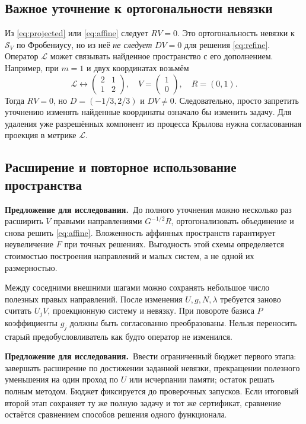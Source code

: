 \documentclass[11pt,a4paper]{article}
\numberwithin{equation}{section}
\theoremstyle{remark}
\newcommand{\proposal}{\par\noindent\textbf{Предложение для исследования.}\ }
\begin{document}
\subsection{Важное уточнение к ортогональности невязки}
Из \eqref{eq:projected} или \eqref{eq:affine} следует $RV=0$.
Это ортогональность невязки к $\mathcal S_V$ по Фробениусу, но из неё
\emph{не следует} $DV=0$ для решения \eqref{eq:refine}.
Оператор $\mathcal L$ может связывать найденное пространство с его
дополнением. Например, при $m=1$ и двух координатах возьмём
\[
 \mathcal L\leftrightarrow
 \begin{pmatrix}2&1\\1&2\end{pmatrix},
 \quad V=\begin{pmatrix}1\\0\end{pmatrix},
 \quad R=(0,1).
\]
Тогда $RV=0$, но $D=(-1/3,2/3)$ и $DV\ne0$.
Следовательно, просто запретить уточнению изменять найденные координаты
означало бы изменить задачу. Для удаления уже разрешённых компонент
из процесса Крылова нужна согласованная проекция в метрике $\mathcal L$.

\subsection{Расширение и повторное использование пространства}
\proposal До полного уточнения можно несколько раз расширить $V$
правыми направлениями $G^{-1/2}R$, ортогонализовать объединение и снова
решить \eqref{eq:affine}. Вложенность аффинных пространств гарантирует
неувеличение $F$ при точных решениях. Выгодность этой схемы определяется
стоимостью построения направлений и малых систем, а не одной их размерностью.

Между соседними внешними шагами можно сохранять небольшое число полезных
правых направлений. После изменения $U,g,N,\lambda$ требуется заново
считать $U_jV$, проекционную систему и невязку. При повороте базиса $P$
коэффициенты $g_j$ должны быть согласованно преобразованы.
Нельзя переносить старый предобусловливатель как будто оператор не изменился.

\proposal Ввести ограниченный бюджет первого этапа: завершать расширение
по достижении заданной невязки, прекращении полезного уменьшения на один
проход по $U$ или исчерпании памяти; остаток решать полным методом.
Бюджет фиксируется до проверочных запусков.
Если итоговый второй этап сохраняет ту же полную задачу и тот же сертификат,
сравнение остаётся сравнением способов решения одного функционала.
\end{document}
